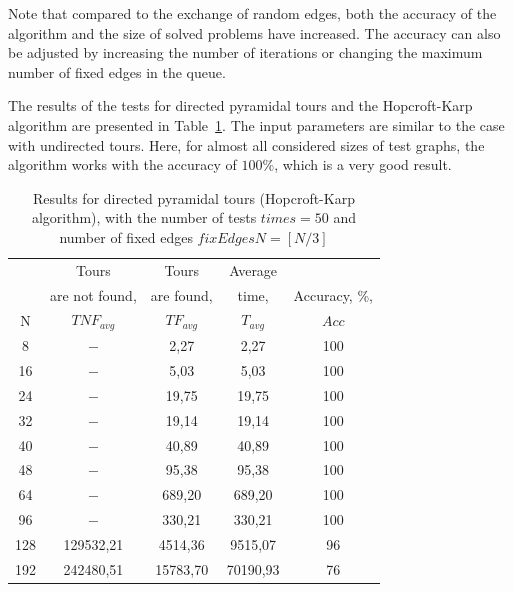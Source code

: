 \documentclass[runningheads]{llncs}
\begin{document}
Note that compared to the exchange of random edges, both the accuracy of the algorithm and the size of solved problems have increased. The accuracy can also be adjusted by increasing the number of iterations or changing the maximum number of fixed edges in the queue. %


The results of the tests for directed pyramidal tours and the Hopcroft-Karp algorithm are presented in Table~\ref{tabl:table2}.
The input parameters are similar to the case with undirected tours. 
Here, for almost all considered sizes of test graphs, the algorithm works with the accuracy of $100\%$, which is a very good result. %

\begin{table}[t]
	\centering
	\caption{\label{tabl:table2}Results for directed pyramidal tours (Hopcroft-Karp algorithm), with the number of tests $times = 50$ and number of fixed edges $fixEdgesN = [N/3]$}
	\begin{tabular}{|*{5}{c|}}
		\hline
		& Tours & Tours & Average & \\
		& are not found, & are found, & time, & Accuracy, \%, \\
		N & $TNF_{avg}$ & $TF_{avg}$ & $T_{avg}$ & $Acc$ \\ 
		\hline
		8 & $-$ & 2,27 & 2,27 & 100 \\ 
		\hline
		16 & $-$ & 5,03 & 5,03 & 100 \\ 
		\hline
		24 & $-$ & 19,75 & 19,75 & 100 \\ 
		\hline
		32 & $-$ & 19,14 & 19,14 & 100 \\ 
		\hline
		40 & $-$ & 40,89 & 40,89 & 100 \\ 
		\hline
		48 & $-$ & 95,38 & 95,38 & 100 \\
		\hline
		64 & $-$ & 689,20 & 689,20 & 100 \\
		\hline
		96 & $-$ & 330,21 & 330,21 & 100 \\
		\hline
		128 & 129532,21 & 4514,36 & 9515,07 & 96 \\
		\hline
		192 & 242480,51 & 15783,70 & 70190,93 & 76 \\
		\hline
	\end{tabular}
\end{table}
\end{document}
